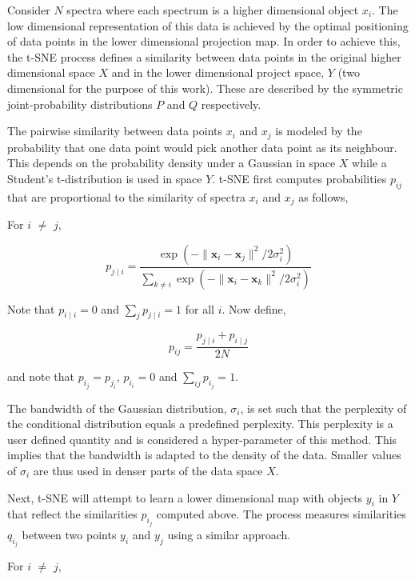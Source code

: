 Consider $N$ spectra where each spectrum is a higher dimensional object $x_i$. The low dimensional representation of this data is achieved by the optimal positioning of data points in the lower dimensional projection map. In order to achieve this, the t-SNE process defines a similarity between data points in the original higher dimensional space $X$ and in the lower dimensional project space, $Y$ (two dimensional for the purpose of this work). These are described by the symmetric joint-probability distributions $P$ and $Q$ respectively.

The pairwise similarity between data points $x_i$ and $x_j$ is modeled by the probability that one data point would pick another data point as its neighbour. This depends on the probability density under a Gaussian in space $X$ while a Student's t-distribution is used in space $Y$. t-SNE first computes probabilities $p_{ij}$ that are proportional to the similarity of spectra $x_i$ and $x_j$ as follows,


For $i$ $\neq$ $j$,

\begin{equation}
p_{j\mid i}={\frac {\exp(-\lVert \mathbf {x} _{i}-\mathbf {x} _{j}\rVert ^{2}/2\sigma _{i}^{2})}{\sum _{k\neq i}\exp(-\lVert \mathbf {x} _{i}-\mathbf {x} _{k}\rVert ^{2}/2\sigma _{i}^{2})}}
\end{equation}

Note that $p_{i\mid i}=0$ and $\sum _{j}p_{j\mid i}=1$ for all $i$. Now define,

\begin{equation}
    p_{ij}={\frac {p_{j\mid i}+p_{i\mid j}}{2N}}
\end{equation}

and note that $p_i_j=p_j_i$, $p_i_i=0$ and $\sum _{ij} p_i_j=1$.

The bandwidth of the Gaussian distribution, $\sigma_i$, is set such that the perplexity of the conditional distribution equals a predefined perplexity. This perplexity is a user defined quantity and is considered a hyper-parameter of this method. This implies that the bandwidth is adapted to the density of the data. Smaller values of $\sigma_i$ are thus used in denser parts of the data space $X$. 

Next, t-SNE will attempt to learn a lower dimensional map with objects $y_i$ in $Y$ that reflect the similarities $p_i_j$ computed above. The process measures similarities $q_i_j$ between two points $y_i$ and $y_j$ using a similar approach. 

For $i$ $\neq$ $j$,

